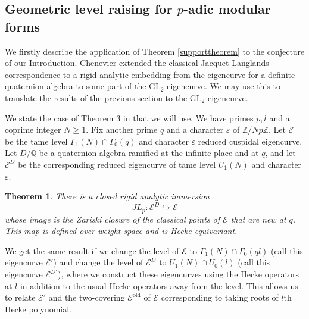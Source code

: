 \documentclass[a4paper, notitlepage]{amsart}
\newcommand{\Z}{\ensuremath{\mathbb{Z}}\xspace}
\newcommand{\Q}{\ensuremath{\mathbb{Q}}\xspace}
\newtheorem{theorem}{Theorem}
\begin{document}
\subsection{Geometric level raising for $p$-adic modular forms}
We firstly describe the application of Theorem \ref{supporttheorem} to the conjecture of our Introduction. Chenevier \cite{MR2111512} extended the classical Jacquet-Langlands correspondence to a rigid analytic embedding from the eigencurve for a definite quaternion algebra to some part of the $\mathrm{GL}_2$ eigencurve. We may use this to translate the results of the previous section to the $\mathrm{GL}_2$ eigencurve. 

We state the case of Theorem $3$ in \cite{MR2111512} that we will use. We have primes $p,l$ and a coprime integer $N \ge 1$. Fix another prime $q$ and a character $\varepsilon$ of $\Z/Np\Z$. Let $\mathscr{E}$ be the tame level $\Gamma_1(N)\cap\Gamma_0(q)$ and character $\varepsilon$ reduced cuspidal eigencurve. Let $D/\Q$ be a quaternion algebra ramified at the infinite place and at $q$, and let $\mathscr{E}^D$ be the corresponding reduced eigencurve of tame level $U_1(N)$ and character $\varepsilon$. 

\begin{theorem}
There is a closed rigid analytic immersion $$JL_p: \mathscr{E}^D \hookrightarrow \mathscr{E}$$ whose image is the Zariski closure of the classical points of $\mathscr{E}$ that are new at $q$. This map is defined over weight space and is Hecke equivariant.
\end{theorem}

We get the same result if we change the level of $\mathscr{E}$ to $\Gamma_1(N)\cap\Gamma_0(ql)$ (call this eigencurve $\mathscr{E}'$) and change the level of $\mathscr{E}^D$ to $U_1(N)\cap U_0(l)$ (call this eigencurve $\mathscr{E}^{D'}$), where we construct these eigencurves using the Hecke operators at $l$ in addition to the usual Hecke operators away from the level. This allows us to relate $\mathscr{E}'$ and the two-covering $\mathscr{E}^{\mathrm{old}}$ of $\mathscr{E}$ corresponding to taking roots of $l$th Hecke polynomial.
\end{document}
